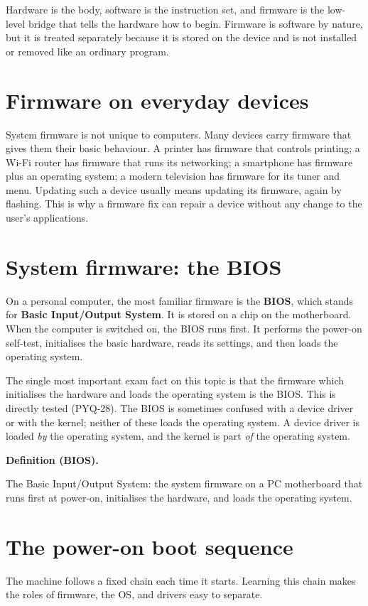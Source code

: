 \documentclass[11pt]{article}
\newenvironment{definitionbox}[1]{%
  \par\noindent\textbf{Definition (#1).}\ \itshape
}{\par\vspace{0.3em}}
\begin{document}
Hardware is the body, software is the instruction set, and firmware is the
low-level bridge that tells the hardware how to begin. Firmware is software
by nature, but it is treated separately because it is stored on the device
and is not installed or removed like an ordinary program.

\section{Firmware on everyday devices}
System firmware is not unique to computers. Many devices carry firmware that
gives them their basic behaviour. A printer has firmware that controls
printing; a Wi-Fi router has firmware that runs its networking; a smartphone
has firmware plus an operating system; a modern television has firmware for
its tuner and menu. Updating such a device usually means updating its
firmware, again by flashing. This is why a firmware fix can repair a device
without any change to the user's applications.

\section{System firmware: the BIOS}
On a personal computer, the most familiar firmware is the \textbf{BIOS},
which stands for \textbf{Basic Input/Output System}. It is stored on a chip
on the motherboard. When the computer is switched on, the BIOS runs first. It
performs the power-on self-test, initialises the basic hardware, reads its
settings, and then loads the operating system.

The single most important exam fact on this topic is that the firmware which
initialises the hardware and loads the operating system is the BIOS. This is
directly tested (PYQ-28). The BIOS is sometimes confused with a device driver
or with the kernel; neither of these loads the operating system. A device
driver is loaded \emph{by} the operating system, and the kernel is part
\emph{of} the operating system.

\begin{definitionbox}{BIOS}
The Basic Input/Output System: the system firmware on a PC motherboard that
runs first at power-on, initialises the hardware, and loads the operating
system.
\end{definitionbox}

\section{The power-on boot sequence}
The machine follows a fixed chain each time it starts. Learning this chain
makes the roles of firmware, the OS, and drivers easy to separate.
\end{document}
